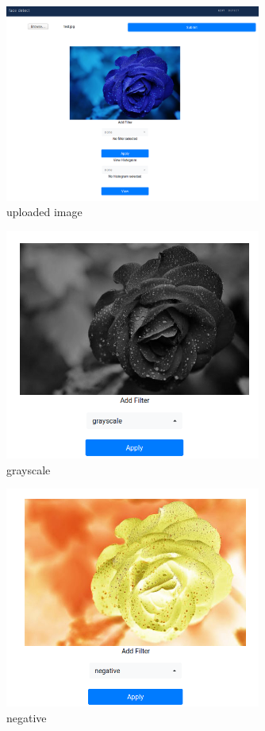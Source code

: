\documentclass{article}
\begin{document}
  \begin{figure}[!htb]
    \centering
    \includegraphics[width=0.75\textwidth]{assets/image_uploaded.png}
    \caption{uploaded image}
    \label{fig:image-uploaded}
  \end{figure}

  \begin{figure}[!htb]
    \centering
    \includegraphics[width=0.75\textwidth]{assets/grayscale.png}
    \caption{grayscale}
    \label{fig:grayscale}
  \end{figure}

  \begin{figure}[!htb]
    \centering
    \includegraphics[width=0.75\textwidth]{assets/negative.png}
    \caption{negative}
    \label{fig:negative}
  \end{figure}
\end{document}
